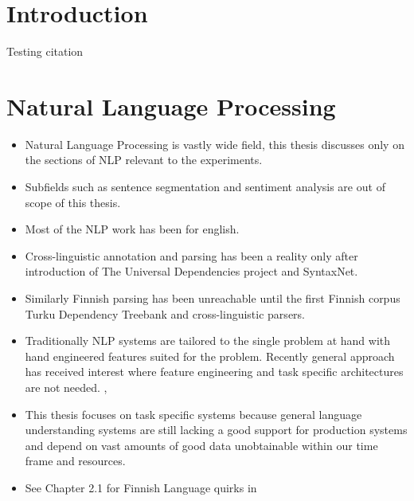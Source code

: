 \documentclass[12pt,a4paper,english
]{tutthesis}
\begin{document}
\newpage

\if@twoside
\cleardoublepage
\fi

\setcounter{page}{1} %
\renewcommand{\chaptername}{} %


\chapter{Introduction}
\label{ch:intro}
Testing citation \cite{Andor2016}


\chapter{Natural Language Processing}
\label{ch:natural_language_processing}
\begin{itemize}
\item Natural Language Processing is vastly wide field, this thesis discusses only on the sections of NLP relevant to the experiments.
\item Subfields such as sentence segmentation and sentiment analysis are out of scope of this thesis.
\item Most of the NLP work has been for english.
\item Cross-linguistic annotation and parsing has been a reality only after introduction of The Universal Dependencies project and SyntaxNet.
\item Similarly Finnish parsing has been unreachable until the first Finnish corpus Turku Dependency Treebank \cite{Haverinen2014} and cross-linguistic parsers.
\item Traditionally NLP systems are tailored to the single problem at hand with hand engineered features suited for the problem. Recently general approach has received interest where feature engineering and task specific architectures are not needed. \cite{Collobert2011}, \cite{Zhang2015}
\item This thesis focuses on task specific systems because general language understanding systems are still lacking a good support for production systems and depend on vast amounts of good data \cite{Zhang2015} unobtainable within our time frame and resources.
\item See Chapter 2.1 for Finnish Language quirks in \cite{Korenius2004}
\end{itemize}
\end{document}
